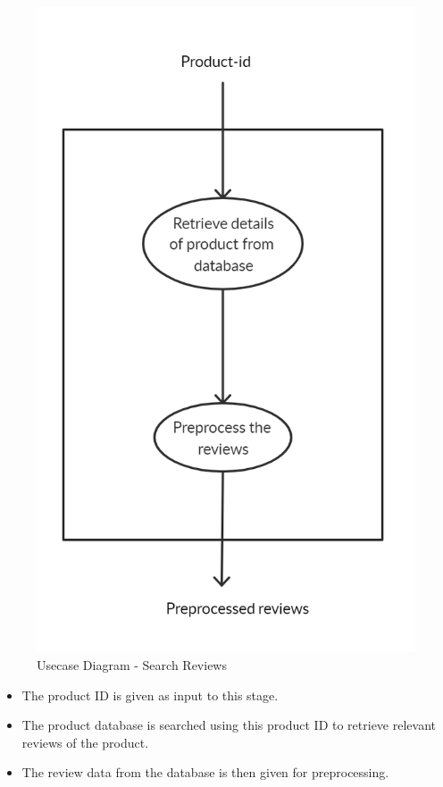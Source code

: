 \documentclass[11pt]{report}
\begin{document}
\begin{figure}[H]
\centering
\includegraphics[scale=0.5]{images/search_usecase.png}
\caption{Usecase Diagram - Search Reviews}
\label{fig:usecase2}
\end{figure}

\begin{itemize}
\item The product ID is given as input to this stage.
\item The product database is searched using this product ID to retrieve relevant reviews of the product. 
\item The review data from the database is then given for preprocessing.
\end{itemize}
\end{document}
